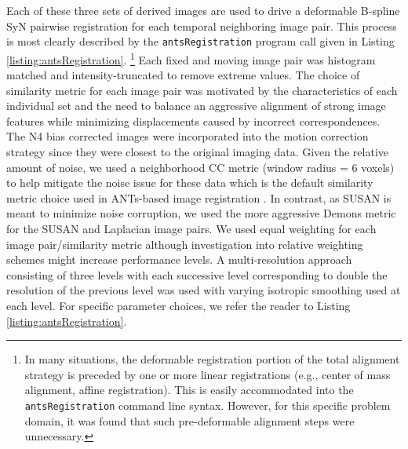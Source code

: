 \documentclass{llncs}
\begin{document}
Each of these three sets of derived images are used to drive a deformable B-spline SyN
pairwise registration for each temporal neighboring image pair.
This process is most clearly described by the {\tt antsRegistration} program call given in Listing 
\ref{listing:antsRegistration}.%
\footnote{
In many situations, the deformable registration portion of the total alignment strategy
is preceded by one or more linear registrations (e.g., center of mass alignment, affine 
registration).  This is easily accommodated into the {\tt antsRegistration} command line
syntax.  However, for this specific problem domain, it was found that such pre-deformable
alignment steps were unnecessary.
}  
Each fixed and moving image pair was histogram
matched \cite{nyul2000} and intensity-truncated to remove extreme values.  The
choice of similarity metric for each image pair was motivated by the characteristics
of each individual set and the need to balance an aggressive alignment of strong image features 
while minimizing displacements caused by incorrect correspondences.  The N4 bias corrected
images were incorporated into the motion correction strategy since they were closest
to the original imaging data. Given the relative amount of noise, we used a neighborhood
CC metric (window radius = 6 voxels) to help mitigate the noise issue for these data which
is the default similarity metric choice used in ANTs-based image registration \cite{avants2008}.  In
contrast, as SUSAN is meant to minimize noise corruption, we used the more aggressive
Demons metric \cite{thirion1998} for the SUSAN and Laplacian image pairs.  We used
equal weighting for each image pair/similarity metric although investigation into
relative weighting schemes might increase performance levels.  A multi-resolution approach
consisting of three levels with each successive level corresponding to double the resolution
of the previous level was used with varying isotropic smoothing used at each level.  For
specific parameter choices, we refer the reader to Listing 
\ref{listing:antsRegistration}.
\end{document}
